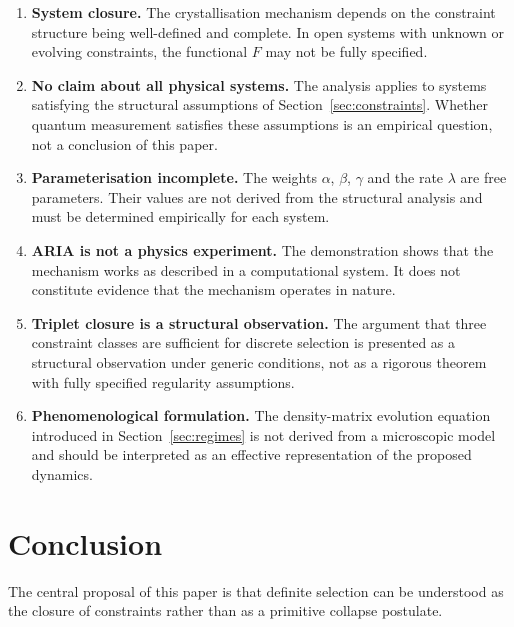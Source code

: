 \documentclass[12pt]{article}
\begin{document}
\begin{enumerate}
    \item \textbf{System closure.} The crystallisation mechanism depends on the constraint structure being well-defined and complete. In open systems with unknown or evolving constraints, the functional $F$ may not be fully specified.

    \item \textbf{No claim about all physical systems.} The analysis applies to systems satisfying the structural assumptions of Section~\ref{sec:constraints}. Whether quantum measurement satisfies these assumptions is an empirical question, not a conclusion of this paper.

    \item \textbf{Parameterisation incomplete.} The weights $\alpha$, $\beta$, $\gamma$ and the rate $\lambda$ are free parameters. Their values are not derived from the structural analysis and must be determined empirically for each system.

    \item \textbf{ARIA is not a physics experiment.} The demonstration shows that the mechanism works as described in a computational system. It does not constitute evidence that the mechanism operates in nature.

    \item \textbf{Triplet closure is a structural observation.} The argument that three constraint classes are sufficient for discrete selection is presented as a structural observation under generic conditions, not as a rigorous theorem with fully specified regularity assumptions.

    \item \textbf{Phenomenological formulation.} The density-matrix evolution equation introduced in Section~\ref{sec:regimes} is not derived from a microscopic model and should be interpreted as an effective representation of the proposed dynamics.
\end{enumerate}

\section{Conclusion}

The central proposal of this paper is that definite selection can be understood as the closure of constraints rather than as a primitive collapse postulate.
\end{document}
